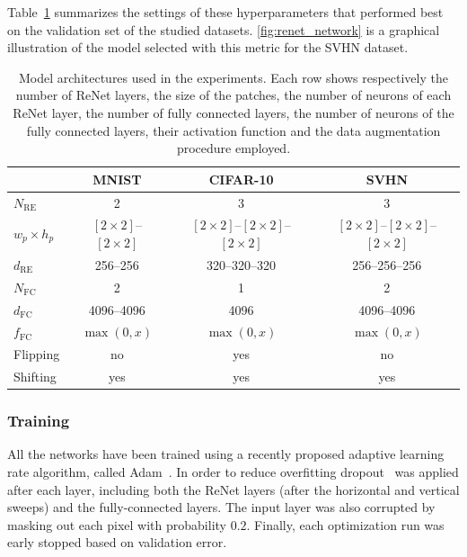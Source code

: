 Table~\ref{tbl:renet_architectures} summarizes the settings of these
hyperparameters that performed best on the validation set of the studied
datasets. \autoref{fig:renet_network} is a graphical illustration of the model
selected with this metric for the SVHN dataset.

\begin{table}[t]
    \centering
    \begin{tabular}{l || c | c | c }
        & MNIST & CIFAR-10 & SVHN \\
        \hline
        \hline
    $N_{\text{RE}}$ & 2 & 3 & 3 \\
        \hline
        $w_p \times h_p$ & $[2\times 2]$--$[2 \times 2]$ & $[2\times 2]$--$[2 \times 2]$--$[2
        \times 2]$ & $[2\times 2]$--$[2 \times 2]$--$[2 \times 2]$ \\
        \hline
    $d_{\text{RE}}$ & 256--256 & 320--320--320 & 256--256--256 \\
        \hline
    $N_{\text{FC}}$ & 2 & 1 & 2 \\
        \hline
    $d_{\text{FC}}$ & 4096--4096 & 4096 & 4096--4096 \\
        \hline
    $f_{\text{FC}}$ & $\max(0, x)$ & $\max(0,x)$ & $\max(0,x)$ \\
        \hline
    Flipping & no & yes & no \\
        \hline
    Shifting & yes & yes & yes \\
    \end{tabular}
    \caption{Model architectures used in the experiments. Each row shows
             respectively the number of ReNet layers, the size of the patches,
             the number of neurons of each ReNet layer, the number of fully
             connected layers, the number of neurons of the fully connected
             layers, their activation function and the data augmentation
             procedure employed.}
    \label{tbl:renet_architectures}
\end{table}

\subsubsection{Training}
All the networks have been trained using a recently proposed adaptive learning
rate algorithm, called Adam~\citep{Kingma2014}. In order to reduce overfitting
dropout~\citep{Srivastava14} was applied after each layer, including both the
ReNet layers (after the horizontal and vertical sweeps) and the fully-connected
layers. The input layer was also corrupted by masking out each pixel with
probability $0.2$. Finally, each optimization run was early stopped based
on validation error.

